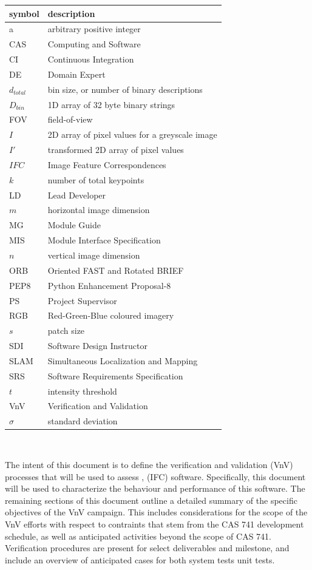 \documentclass[12pt, titlepage]{article}
\begin{document}
\renewcommand{\arraystretch}{1.2}
\begin{tabular}{l l} 
  \toprule		
  \textbf{symbol} & \textbf{description}\\
  \midrule
  a & arbitrary positive integer\\
  CAS & Computing and Software\\
  CI & Continuous Integration\\
  DE & Domain Expert \\
  $d_{total}$ & bin size, or number of binary descriptions \\
  $D_{bin}$ & 1D array of 32 byte binary strings \\
  FOV & field-of-view\\
  $I$ & 2D array of pixel values for a greyscale image \\
  $I'$ & transformed 2D array of pixel values\\
  $IFC$ & Image Feature Correspondences\\
  $k$ & number of total keypoints\\
  LD & Lead Developer \\
  $m$ & horizontal image dimension\\
  MG & Module Guide \\
  MIS & Module Interface Specification\\
  $n$ & vertical image dimension\\
  ORB & Oriented FAST and Rotated BRIEF\\
  PEP8 & Python Enhancement Proposal-8\\
  PS & Project Supervisor\\
  RGB & Red-Green-Blue coloured imagery\\
  $s$ & patch size\\
  SDI & Software Design Instructor\\
  SLAM & Simultaneous Localization and Mapping\\
  SRS & Software Requirements Specification\\
  $t$ & intensity threshold \\
  VnV & Verification and Validation\\
  $\sigma$ & standard deviation\\
  \bottomrule
\end{tabular}\\

\newpage

\noindent The intent of this document is to define the verification and validation (VnV) processes
that will be used to assess \progname, (IFC) software. Specifically, this document will be used to 
characterize the behaviour and performance of this software. The remaining sections of this document 
outline a detailed summary of the specific objectives of the VnV campaign. This includes considerations 
for the scope of the VnV efforts with respect to contraints that stem from the CAS 741 
development schedule, as well as anticipated activities beyond the scope of CAS 741.
Verification procedures are present for select deliverables and milestone, and include 
an overview of anticipated cases for both system tests unit tests.
\end{document}
